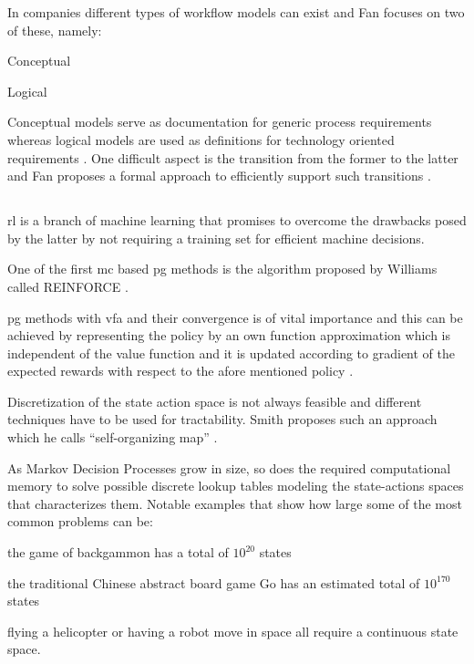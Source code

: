 \documentclass{seal_thesis}
\begin{document}
In companies different types of workflow models can exist and Fan focuses on two of these, namely:
\begin{enumerate*}
	\item Conceptual
	\item Logical
\end{enumerate*}

Conceptual models serve as documentation for generic process requirements whereas logical models are used as definitions for technology oriented requirements \cite{Fan2012}. One difficult aspect is the transition from the former to the latter and Fan proposes a formal approach to efficiently support such transitions \cite{Fan2012}.

\subsection{}

\gls{rl} is a branch of machine learning that promises to overcome the drawbacks posed by the latter by not requiring a training set for efficient machine decisions.

One of the first \gls{mc} based \gls{pg} methods is the algorithm proposed by Williams called REINFORCE \cite{Williams1992}.

\gls{pg} methods with \gls{vfa} and their convergence is of vital importance and this can be achieved by representing the policy by an own function approximation which is independent of the value function and it is updated according to gradient of the expected rewards with respect to the afore mentioned policy \cite{Sutton1999}.

Discretization of the state action space is not always feasible and different techniques have to be used for tractability. Smith proposes such an approach which he calls ``self-organizing map'' \cite{Smith2002}.

As Markov Decision Processes grow in size, so does the required computational memory to solve possible discrete lookup tables modeling the state-actions spaces that characterizes them. Notable examples that show how large some of the most common problems can be:
\begin{enumerate*}
	\item the game of backgammon has a total of $10^{20}$ states
	\item the traditional Chinese abstract board game Go has an estimated total of $10^{170}$ states
	\item flying a helicopter or having a robot move in space all require a continuous state space.
\end{enumerate*}
\end{document}
